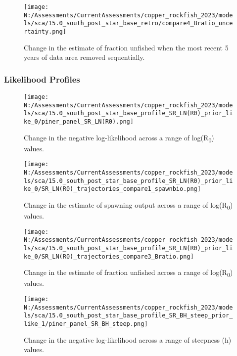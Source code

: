 \documentclass[11pt,
  english,
  letterpaper,
]{article}
\begin{document}
\pagebreak

\begin{figure}
\centering
\texttt{[image: N:/Assessments/CurrentAssessments/copper\_rockfish\_2023/models/sca/15.0\_south\_post\_star\_base\_retro/compare4\_Bratio\_uncertainty.png]}
\caption{Change in the estimate of fraction unfished when the most recent 5 years of data area removed sequentially.\label{fig:retro-depl}}
\end{figure}

\hypertarget{likelihood-profiles-1}{%
\subsubsection{Likelihood Profiles}\label{likelihood-profiles-1}}

\begin{figure}
\centering
\texttt{[image: N:/Assessments/CurrentAssessments/copper\_rockfish\_2023/models/sca/15.0\_south\_post\_star\_base\_profile\_SR\_LN(R0)\_prior\_like\_0/piner\_panel\_SR\_LN(R0).png]}
\caption{Change in the negative log-likelihood across a range of log(R\textsubscript{0}) values.\label{fig:r0-profile}}
\end{figure}

\pagebreak

\begin{figure}
\centering
\texttt{[image: N:/Assessments/CurrentAssessments/copper\_rockfish\_2023/models/sca/15.0\_south\_post\_star\_base\_profile\_SR\_LN(R0)\_prior\_like\_0/SR\_LN(R0)\_trajectories\_compare1\_spawnbio.png]}
\caption{Change in the estimate of spawning output across a range of log(R\textsubscript{0}) values.\label{fig:r0-ssb}}
\end{figure}

\pagebreak

\begin{figure}
\centering
\texttt{[image: N:/Assessments/CurrentAssessments/copper\_rockfish\_2023/models/sca/15.0\_south\_post\_star\_base\_profile\_SR\_LN(R0)\_prior\_like\_0/SR\_LN(R0)\_trajectories\_compare3\_Bratio.png]}
\caption{Change in the estimate of fraction unfished across a range of log(R\textsubscript{0}) values.\label{fig:r0-depl}}
\end{figure}

\pagebreak

\begin{figure}
\centering
\texttt{[image: N:/Assessments/CurrentAssessments/copper\_rockfish\_2023/models/sca/15.0\_south\_post\_star\_base\_profile\_SR\_BH\_steep\_prior\_like\_1/piner\_panel\_SR\_BH\_steep.png]}
\caption{Change in the negative log-likelihood across a range of steepness (h) values.\label{fig:h-profile}}
\end{figure}
\end{document}

